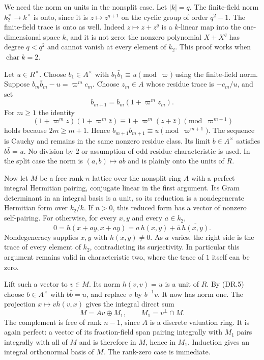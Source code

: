 \documentclass[11pt,a4paper]{article}
\numberwithin{equation}{section}
\theoremstyle{remark}\newtheorem{remark}[theorem]{Remark}
\begin{document}
We need the norm on units in the nonsplit case. Let $|k|=q$.
The finite-field norm $k_2^\times\to k^\times$ is onto, since
it is $z\mapsto z^{q+1}$ on the cyclic group of order $q^2-1$.
The finite-field trace is onto as well. Indeed
$z\mapsto z+z^q$ is a $k$-linear map into the one-dimensional
space $k$, and it is not zero: the nonzero polynomial $X+X^q$
has degree $q<q^2$ and cannot vanish at every element of $k_2$.
This proof works when $\operatorname{char}k=2$.

Let $u\in R^\times$. Choose $b_1\in A^\times$ with
$b_1\bar b_1\equiv u\pmod\varpi$ using the finite-field norm.
Suppose $b_m\bar b_m-u=\varpi^m c_m$. Choose $z_m\in A$
whose residue trace is $-c_m/u$, and set
\[
                    b_{m+1}=b_m(1+\varpi^m z_m).
 \tag{DR.5}
\]
For $m\ge1$ the identity
\[
 (1+\varpi^m z)(1+\varpi^m\bar z)
       \equiv1+\varpi^m(z+\bar z)\pmod{\varpi^{m+1}}
 \tag{DR.6}
\]
holds because $2m\ge m+1$. Hence
$b_{m+1}\bar b_{m+1}\equiv u\pmod{\varpi^{m+1}}$.
The sequence is Cauchy and remains in the same nonzero residue class.
Its limit $b\in A^\times$ satisfies $b\bar b=u$.
No division by $2$ or assumption of odd residue characteristic is
used. In the split case the norm is $(a,b)\mapsto ab$ and is
plainly onto the units of $R$.

Now let $M$ be a free rank-$n$ lattice over the nonsplit ring $A$
with a perfect integral Hermitian pairing, conjugate linear in the
first argument. Its Gram determinant in an integral basis is a unit,
so its reduction is a nondegenerate Hermitian form over $k_2/k$.
If $n>0$, this reduced form has a vector of nonzero self-pairing.
For otherwise, for every $x,y$ and every $a\in k_2$,
\[
 0=h(x+ay,x+ay)=a\,h(x,y)+\bar a\,\overline{h(x,y)}.
 \tag{DR.7}
\]
Nondegeneracy supplies $x,y$ with $h(x,y)\ne0$. As $a$ varies,
the right side is the trace of every element of $k_2$, contradicting
its surjectivity. In particular this argument remains valid in
characteristic two, where the trace of $1$ itself can be zero.

Lift such a vector to $v\in M$. Its norm $h(v,v)=u$ is a unit
of $R$. By (DR.5) choose $b\in A^\times$ with $b\bar b=u$,
and replace $v$ by $b^{-1}v$. It now has norm one. The projection
$x\mapsto v h(v,x)$ gives the integral direct sum
\[
             M=Av\oplus M_1,\qquad M_1=v^\perp\cap M.
 \tag{DR.8}
\]
The complement is free of rank $n-1$, since $A$ is a discrete
valuation ring. It is again perfect: a vector of its fraction-field
span pairing integrally with $M_1$ pairs integrally with all of $M$
and is therefore in $M$, hence in $M_1$. Induction gives an integral
orthonormal basis of $M$. The rank-zero case is immediate.
\end{document}
